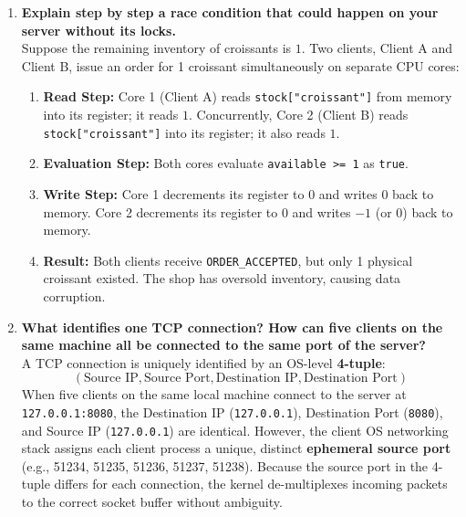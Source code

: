 \documentclass{labreport}
\begin{document}
\begin{enumerate}
    \item \textbf{Explain step by step a race condition that could happen on your server without its locks.}\\
    Suppose the remaining inventory of croissants is $1$. Two clients, Client A and Client B, issue an order for 1 croissant simultaneously on separate CPU cores:
    \begin{enumerate}
        \item \textbf{Read Step:} Core 1 (Client A) reads \texttt{stock["croissant"]} from memory into its register; it reads $1$. Concurrently, Core 2 (Client B) reads \texttt{stock["croissant"]} into its register; it also reads $1$.
        \item \textbf{Evaluation Step:} Both cores evaluate \texttt{available >= 1} as \texttt{true}.
        \item \textbf{Write Step:} Core 1 decrements its register to $0$ and writes $0$ back to memory. Core 2 decrements its register to $0$ and writes $-1$ (or $0$) back to memory.
        \item \textbf{Result:} Both clients receive \texttt{ORDER\_ACCEPTED}, but only 1 physical croissant existed. The shop has oversold inventory, causing data corruption.
    \end{enumerate}

    \item \textbf{What identifies one TCP connection? How can five clients on the same machine all be connected to the same port of the server?}\\
    A TCP connection is uniquely identified by an OS-level \textbf{4-tuple}:
    \begin{equation}
    (\text{Source IP}, \text{Source Port}, \text{Destination IP}, \text{Destination Port})
    \end{equation}
    When five clients on the same local machine connect to the server at \texttt{127.0.0.1:8080}, the Destination IP (\texttt{127.0.0.1}), Destination Port (\texttt{8080}), and Source IP (\texttt{127.0.0.1}) are identical. However, the client OS networking stack assigns each client process a unique, distinct \textbf{ephemeral source port} (e.g., 51234, 51235, 51236, 51237, 51238). Because the source port in the 4-tuple differs for each connection, the kernel de-multiplexes incoming packets to the correct socket buffer without ambiguity.
\end{enumerate}

\newpage

\end{document}
